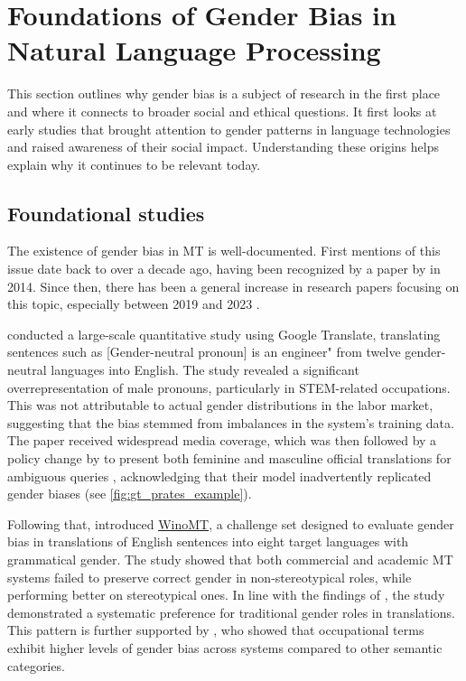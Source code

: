 
\section{Foundations of Gender Bias in Natural Language Processing}

This section outlines why gender bias is a subject of research in the first place and where it connects to broader social and ethical questions. It first looks at early studies that brought attention to gender patterns in language technologies and raised awareness of their social impact. Understanding these origins helps explain why it continues to be relevant today.

\subsection{Foundational studies}
The existence of gender bias in MT is well-documented. First mentions of this issue date back to over a decade ago, having been recognized by a paper by \citeauthor{schiebingerScientificResearchMust2014} in 2014. Since then, there has been a general increase in research papers focusing on this topic, especially between 2019 and 2023 \citep{savoldiDecadeGenderBias2025}.

\textbf{\citet{pratesAssessingGenderBias2019}} conducted a large-scale quantitative study using Google Translate, translating sentences such as [Gender-neutral pronoun] is an engineer" from twelve gender-neutral languages into English. The study revealed a significant overrepresentation of male pronouns, particularly in STEM-related occupations. This was not attributable to actual gender distributions in the labor market, suggesting that the bias stemmed from imbalances in the system’s training data. The paper received widespread media coverage, which was then followed by a policy change by \citeauthor{googleReducingGenderBias2018} to present both feminine and masculine official translations for ambiguous queries \citep{googleReducingGenderBias2018}, acknowledging that their model inadvertently replicated gender biases (see \autoref{fig:gt_prates_example}). 

Following that, \textbf{\citet{stanovskyEvaluatingGenderBias2019}} introduced \href{https://github.com/gabrielStanovsky/mt_gender}{WinoMT}, a challenge set designed to evaluate gender bias in translations of English sentences into eight target languages with grammatical gender. The study showed that both commercial and academic MT systems failed to preserve correct gender in non-stereotypical roles, while performing better on stereotypical ones. In line with the findings of \citeauthor{pratesAssessingGenderBias2019}, the study demonstrated a systematic preference for traditional gender roles in translations. This pattern is further supported by \textbf{\citet{choMeasuringGenderBias2019}}, who showed that occupational terms exhibit higher levels of gender bias across systems compared to other semantic categories. 

